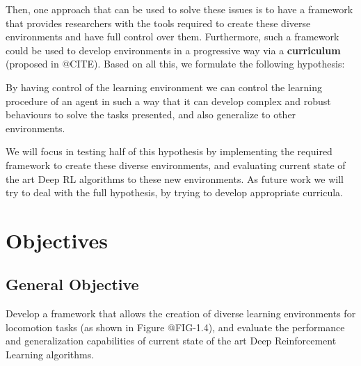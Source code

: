 Then, one approach that can be used to solve these issues is to have a framework
that provides researchers with the tools required to create these diverse environments
and have full control over them. Furthermore, such a framework could be used to develop
environments in a progressive way via a \textbf{curriculum} (proposed in @CITE). Based on
all this, we formulate the following hypothesis:

\begin{hypothesis}
	By having control of the learning environment we can control the learning procedure
	of an agent in such a way that it can develop complex and robust behaviours to solve
	the tasks presented, and also generalize to other environments.
\end{hypothesis}

We will focus in testing half of this hypothesis by implementing the required framework
to create these diverse environments, and evaluating current state of the art Deep RL algorithms
to these new environments. As future work we will try to deal with the full hypothesis, by
trying to develop appropriate curricula.

\figEnvManipSimToreal

\figEnvironmentsProposalFromTo

\section{Objectives}
\label{sec:objectives}

\subsection*{General Objective}
Develop a framework that allows the creation of diverse learning environments for locomotion tasks (as shown in Figure @FIG-1.4), 
and evaluate the performance and generalization capabilities of current state of the art Deep 
Reinforcement Learning algorithms.

